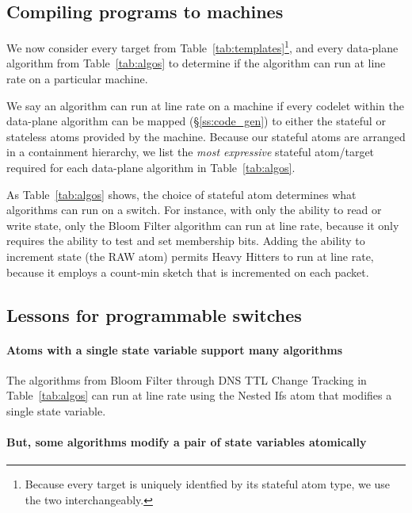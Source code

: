 \subsection{Compiling \pktlanguage programs to \absmachine machines}
\label{ss:compiler}
We now consider every target from Table~\ref{tab:templates}\footnote{Because
every target is uniquely identfied by its stateful atom type, we use the two
interchangeably.}, and every data-plane algorithm from Table~\ref{tab:algos} to
determine if the algorithm can run at line rate on a particular \absmachine
machine.

We say an algorithm can run at line rate on a \absmachine machine if every
codelet within the data-plane algorithm can be mapped (\S\ref{ss:code_gen}) to
either the stateful or stateless atoms provided by the \absmachine machine.
Because our stateful atoms are arranged in a containment hierarchy, we list the
\textit{most expressive} stateful atom/target required for each data-plane
algorithm in Table~\ref{tab:algos}.

As Table~\ref{tab:algos} shows, the choice of stateful atom determines
 what algorithms can run on a switch. For instance, with only the
ability to read or write state, only the Bloom Filter algorithm can run at line
rate, because it only requires the ability to test and set membership bits.
Adding the ability to increment state (the RAW atom) permits Heavy
Hitters to run at line rate, because it employs a count-min sketch that is
incremented on each packet.

\subsection{Lessons for programmable switches}
\label{ss:lessons}
\paragraph{Atoms with a single state variable support many algorithms}

The algorithms from Bloom Filter through DNS TTL Change Tracking
in Table~\ref{tab:algos} can run at line rate using the Nested Ifs atom that
modifies a single state variable.

\paragraph{But, some algorithms modify a pair of state variables atomically}

